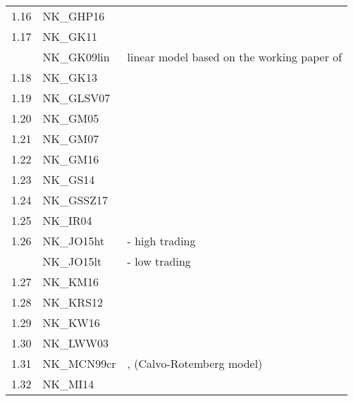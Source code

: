 \documentclass[11pt,a4paper]{article}
\begin{document}
\begin{table}[H]
\begin{tabularx}{\textwidth}{lll}
			1.16	&	NK\_GHP16	&	\cite{gnocci2016housework}	\\	
			1.17	&	NK\_GK11	&	\cite{GertlerKaradi2011}	\\								
			&	NK\_GK09lin	&	linear	model	based	on	the	working	paper	of	\cite{GertlerKaradi2011}	\\
			1.18	&	NK\_GK13	&	\cite{GertlerKaradi2013}	\\		
			1.19	&	NK\_GLSV07	&	\cite{gali2007understanding}	\\
			1.20	&	NK\_GM05	&	\cite{GaliMonacelli2005}	\\								
			1.21	&	NK\_GM07	&	\cite{goodfriend2007banking}	\\								
			1.22	&	NK\_GM16	&	\cite{gali2016understanding}	\\														
			1.23	&	NK\_GS14	&	\cite{gambacorta2014should}	\\								
			1.24	&	NK\_GSSZ17	&	\cite{gilchrist2017inflation}	\\								
			1.25	&	NK\_IR04	&	\cite{Ireland2004}	\\								
			1.26	&	NK\_JO15ht	&	\cite{jang2015okano}	-	high	trading\\						
			&	NK\_JO15lt	&	\cite{jang2015okano}	-	low	trading\\						
			1.27	&	NK\_KM16	&	\cite{krause2016public}	\\								
			1.28	&	NK\_KRS12	&	\cite{KannanRabanalScott2012}	\\								
			1.29	&	NK\_KW16	&	\cite{kirchner2016fiscal}	\\								
			1.30\footnotemark[1]	&	NK\_LWW03	&	\cite{LevinWielandWilliams2003}\\%
			1.31\footnotemark[1]	&	NK\_MCN99cr	&	\cite{McCallumNelson1999},	(Calvo-Rotemberg	model)\\%
			1.32	&	NK\_MI14	&	\cite{michaillat2014atheory}	\\								
			

\end{tabularx}
\end{table}
\end{document}
